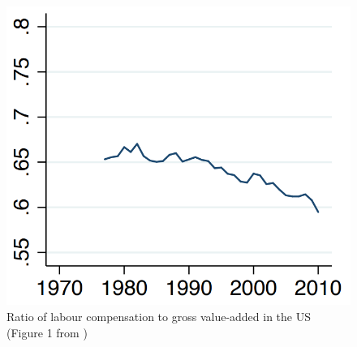 \documentclass{amsart}
\theoremstyle{definition}
\theoremstyle{remark}
\numberwithin{equation}{section}
\begin{document}
\begin{figure}[h!]
    \includegraphics[width=0.5 \textwidth]{labourShare.PNG}
    \caption{Ratio of labour compensation to gross value-added in the US (Figure 1 from \cite{autor2019fall})}
    \label{fig:labourShare}
\end{figure}




\end{document}
